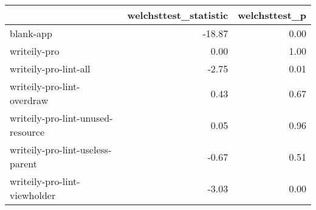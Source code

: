 \begin{tabular}{lrr}
\toprule
{} &  welchsttest\_statistic &  welchsttest\_p \\
\midrule
blank-app                         &                 -18.87 &           0.00 \\
writeily-pro                      &                   0.00 &           1.00 \\
writeily-pro-lint-all             &                  -2.75 &           0.01 \\
writeily-pro-lint-overdraw        &                   0.43 &           0.67 \\
writeily-pro-lint-unused-resource &                   0.05 &           0.96 \\
writeily-pro-lint-useless-parent  &                  -0.67 &           0.51 \\
writeily-pro-lint-viewholder      &                  -3.03 &           0.00 \\
\bottomrule
\end{tabular}
